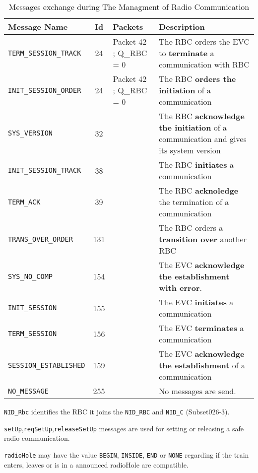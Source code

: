 \begin{table}[htbp]
  \begin{tabular}{lclp{}}\hline
  Message Name & Id & Packets& Description \\\hline
  \verb+TERM_SESSION_TRACK+& 24 & Packet 42 ; Q\_RBC = 0& The RBC orders the EVC to {\bf terminate} a communication with RBC \\
   \verb+INIT_SESSION_ORDER+ & 24 &Packet 42 ; Q\_RBC = 0 & 
   The RBC {\bf orders the initiation} of a communication \\
  \verb+SYS_VERSION+ & 32 & & The RBC {\bf acknowledge the initiation} of a
  communication and gives its system version \\
  \verb+INIT_SESSION_TRACK+ & 38 & &  The RBC {\bf initiates} a communication \\
  \verb+TERM_ACK+ & 39 & &  The RBC {\bf acknoledge} the termination of a communication \\
  \verb+TRANS_OVER_ORDER+ & 131 & & The RBC orders a {\bf transition over} another RBC \\
  \verb+SYS_NO_COMP+ & 154 &&The EVC {\bf acknowledge the establishment with error}. \\
  \verb+INIT_SESSION+& 155 &&  The EVC {\bf initiates} a communication \\
  \verb+TERM_SESSION+ & 156&&The EVC {\bf terminates} a communication  \\
  \verb+SESSION_ESTABLISHED+ & 159 & & The EVC {\bf acknowledge the establishment} of a communication \\
  \verb+NO_MESSAGE+ & 255 & & No messages are send. \\
  \hline
  \end{tabular}
  \caption{\label{table:Messages} Messages exchange during The Managment of
  Radio Communication}
\end{table}

\begin{description}
\item \verb+NID_Rbc+ identifies the RBC it joins the \verb+NID_RBC+ and
\verb+NID_C+ (Subset026-3).
\item \verb+setUp+,\verb+reqSetUp+,\verb+releaseSetUp+ messages are used for setting
or releasing a safe radio communication.
\item \verb+radioHole+ may have the value \verb+BEGIN+, \verb+INSIDE+,
\verb+END+ or
\verb+NONE+ regarding if the train enters, leaves or is in a announced radioHole 
are compatible.
\end{description}

